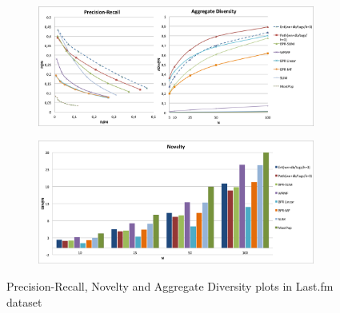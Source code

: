 \begin{figure}
	\centering
	\begin{subfigure}[b]{0.5\textwidth}
		\includegraphics[width=\textwidth]{ch06_graph-rec/pics/pr_adiv_lf.png}
	\end{subfigure}
	\begin{subfigure}[b]{0.5\textwidth}
		\includegraphics[width=\textwidth]{ch06_graph-rec/pics/nov_lf.png}
	\end{subfigure}
	\caption{Precision-Recall, Novelty and Aggregate Diversity plots in Last.fm dataset\label{fig:graph-rec:accur_sf}}
\end{figure}

